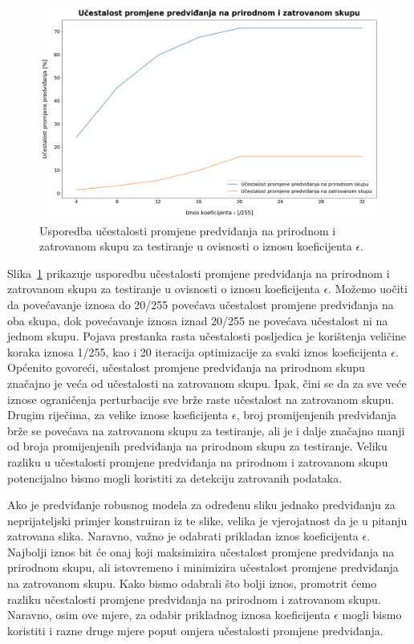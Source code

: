 \documentclass[times, utf8, zavrsni, numeric]{fer}
\begin{document}
\begin{figure}[htb]
    \centering
    \includegraphics[scale=0.355]{../poisoned_stats/change_of_predictions_comparison_double.png}
    \caption{Usporedba učestalosti promjene predviđanja na prirodnom i zatrovanom skupu za testiranje u ovisnosti o iznosu koeficijenta $\epsilon$.}
    \label{fig:change_of_predictions_comparison}
\end{figure}

\pagebreak

Slika~\ref{fig:change_of_predictions_comparison} prikazuje usporedbu učestalosti promjene predviđanja na prirodnom i zatrovanom skupu za testiranje u ovisnosti o iznosu koeficijenta $\epsilon$.
Možemo uočiti da povećavanje iznosa do 20/255 povećava učestalost promjene predviđanja na oba skupa, dok povećavanje iznosa iznad 20/255 ne povećava učestalost ni na jednom skupu.
Pojava prestanka rasta učestalosti posljedica je korištenja veličine koraka iznosa 1/255, kao i 20 iteracija optimizacije za svaki iznos koeficijenta $\epsilon$.
Općenito govoreći, učestalost promjene predviđanja na prirodnom skupu značajno je veća od učestalosti na zatrovanom skupu.
Ipak, čini se da za sve veće iznose ograničenja perturbacije sve brže raste učestalost na zatrovanom skupu. 
Drugim riječima, za velike iznose koeficijenta $\epsilon$, broj promijenjenih predviđanja brže se povećava na zatrovanom skupu za testiranje, ali je i dalje značajno manji od broja promijenjenih predviđanja na prirodnom skupu za testiranje.
Veliku razliku u učestalosti promjene predviđanja na prirodnom i zatrovanom skupu potencijalno bismo mogli koristiti za detekciju zatrovanih podataka. 

Ako je predviđanje robusnog modela za određenu sliku jednako predviđanju za neprijateljski primjer konstruiran iz te slike, velika je vjerojatnost da je u pitanju zatrovana slika.
Naravno, važno je odabrati prikladan iznos koeficijenta $\epsilon$. Najbolji iznos bit će onaj koji maksimizira učestalost promjene predviđanja na prirodnom skupu, ali istovremeno i minimizira učestalost promjene predviđanja na zatrovanom skupu.
Kako bismo odabrali što bolji iznos, promotrit ćemo razliku učestalosti promjene predviđanja na prirodnom i zatrovanom skupu.
Naravno, osim ove mjere, za odabir prikladnog iznosa koeficijenta $\epsilon$ mogli bismo koristiti i razne druge mjere poput omjera učestalosti promjene predviđanja.
\end{document}
